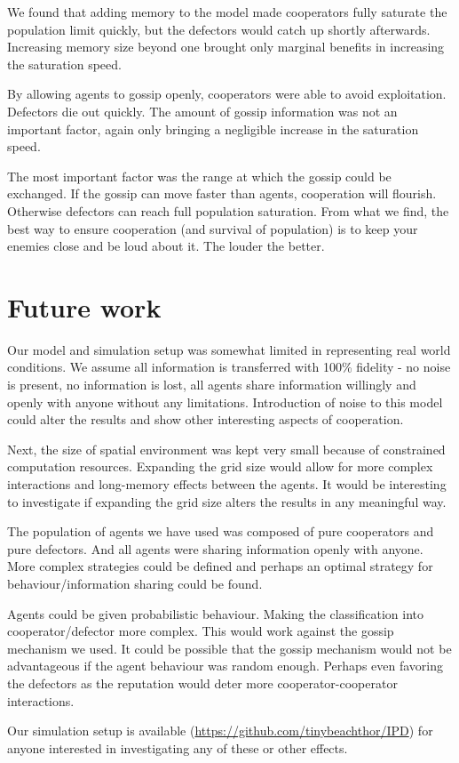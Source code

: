 \documentclass[english]{article}
\begin{document}
We found that adding memory to the model made cooperators fully saturate the population limit quickly, but the defectors would catch up shortly afterwards.
Increasing memory size beyond one brought only marginal benefits in increasing the saturation speed.

By allowing agents to gossip openly, cooperators were able to avoid exploitation. Defectors die out quickly.
The amount of gossip information was not an important factor, again only bringing a negligible increase in the saturation speed.

The most important factor was the range at which the gossip could be exchanged.
If the gossip can move faster than agents, cooperation will flourish.
Otherwise defectors can reach full population saturation.
From what we find, the best way to ensure cooperation (and survival of population) is to keep your enemies close and be loud about it. The louder the better.



\section{Future work}
Our model and simulation setup was somewhat limited in representing real world conditions.
We assume all information is transferred with 100\% fidelity - no noise is present, no information is lost, all agents share information willingly and openly with anyone without any limitations. Introduction of noise to this model could alter the results and show other interesting aspects of cooperation.

Next, the size of spatial environment was kept very small because of constrained computation resources. Expanding the grid size would allow for more complex interactions and long-memory effects between the agents.
It would be interesting to investigate if expanding the grid size alters the results in any meaningful way.

The population of agents we have used was composed of pure cooperators and pure defectors.
And all agents were sharing information openly with anyone.
More complex strategies could be defined and perhaps an optimal strategy for behaviour/information sharing could be found.

Agents could be given probabilistic behaviour. Making the classification into cooperator/defector more complex. This would work against the gossip mechanism we used.
It could be possible that the gossip mechanism would not be advantageous if the agent behaviour was random enough.
Perhaps even favoring the defectors as the reputation would deter more cooperator-cooperator interactions.

Our simulation setup is available
(\url{https://github.com/tinybeachthor/IPD})
for anyone interested in investigating any of these or other effects.



\pagebreak

\end{document}
